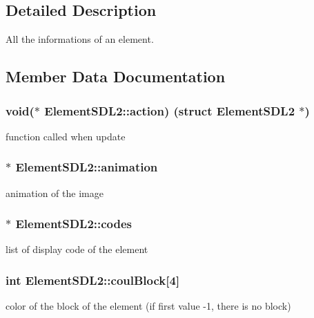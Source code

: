 \subsection{Detailed Description}
All the informations of an element. 

\subsection{Member Data Documentation}
\subsubsection[{\texorpdfstring{action}{action}}]{\setlength{\rightskip}{0pt plus 5cm}void($\ast$ Element\+S\+D\+L2\+::action) (struct {\bf Element\+S\+D\+L2} $\ast$)}\hypertarget{structElementSDL2_a86441847b7f6595e3405d6d9bbf1b8d9}{}\label{structElementSDL2_a86441847b7f6595e3405d6d9bbf1b8d9}
function called when update 
\subsubsection[{\texorpdfstring{animation}{animation}}]{$\ast$ Element\+S\+D\+L2\+::animation}\hypertarget{structElementSDL2_a9b7927abbd7b67f843758ff65436fbb5}{}\label{structElementSDL2_a9b7927abbd7b67f843758ff65436fbb5}
animation of the image 
\subsubsection[{\texorpdfstring{codes}{codes}}]{$\ast$ Element\+S\+D\+L2\+::codes}\hypertarget{structElementSDL2_a60652c6e4cf3d38aadbc650a624d2999}{}\label{structElementSDL2_a60652c6e4cf3d38aadbc650a624d2999}
list of display code of the element 
\subsubsection[{\texorpdfstring{coul\+Block}{coulBlock}}]{\setlength{\rightskip}{0pt plus 5cm}int Element\+S\+D\+L2\+::coul\+Block\mbox{[}4\mbox{]}}\hypertarget{structElementSDL2_a527fdb85c7fa55880dfcd9ddfdd4e0b9}{}\label{structElementSDL2_a527fdb85c7fa55880dfcd9ddfdd4e0b9}
color of the block of the element (if first value -\/1, there is no block) 
